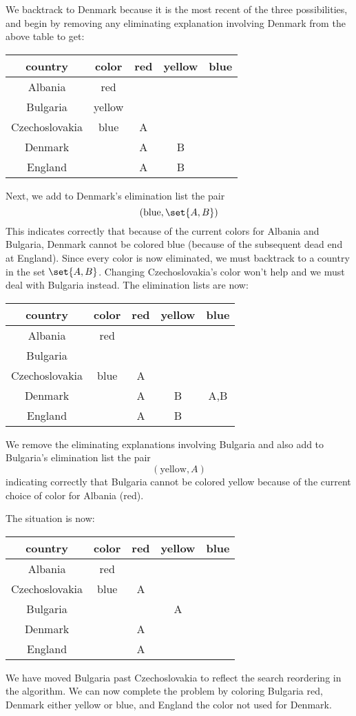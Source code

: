 We backtrack to Denmark because it is the most recent of the three
possibilities, and begin by removing any eliminating explanation
involving Denmark from the above table to get:
 \begin{center}
 \begin{tabular}{c||c||c|c|c}
country & color & red & yellow & blue \\
\hline
Albania & red &&& \\
Bulgaria & yellow &&& \\
Czechoslovakia & blue & A && \\
Denmark && A & B & \\
England && A & B &
 \end{tabular}
 \end{center}
 
Next, we add to Denmark's elimination list the pair
 \[(\mbox{blue},\set{A,B})\]
 This indicates correctly that because of the current colors for
Albania and Bulgaria, Denmark cannot be colored blue (because of the
subsequent dead end at England).  Since every color is now eliminated,
we must backtrack to a country in the set $\set{A,B}$.  Changing
Czechoslovakia's color won't help and we must deal with Bulgaria
instead.  The elimination lists are now:
 \begin{center}
 \begin{tabular}{c||c||c|c|c}
country & color & red & yellow & blue \\
\hline
Albania & red &&& \\
Bulgaria &  &&& \\
Czechoslovakia & blue & A && \\
Denmark & & A & B & A,B \\
England && A & B &
 \end{tabular}
 \end{center}
 We remove the eliminating explanations involving Bulgaria and also
add to Bulgaria's elimination list the pair
 \[(\mbox{yellow},A)\]
 indicating correctly that Bulgaria cannot be colored yellow because
of the current choice of color for Albania (red).

The situation is now:
 \begin{center}
 \begin{tabular}{c||c||c|c|c}
country & color & red & yellow & blue \\
\hline
Albania & red &&& \\
Czechoslovakia & blue & A && \\
Bulgaria &  && A & \\
Denmark && A && \\
England && A &&
 \end{tabular}
 \end{center}
 We have moved Bulgaria past Czechoslovakia to reflect the search
reordering in the algorithm.  We can now complete the problem by
coloring Bulgaria red, Denmark either yellow or blue, and England the
color not used for Denmark.

